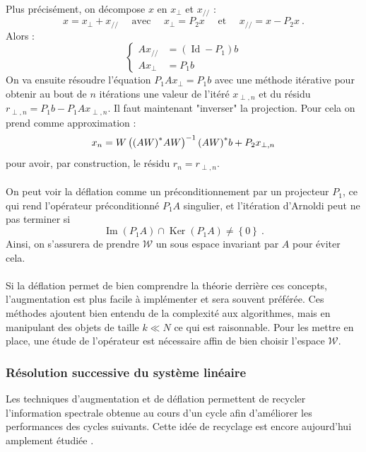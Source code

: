       \paragraph{}
      Plus précisément, on décompose $x$ en $x_\perp$ et $x_{//}$ :
      \[x = x_\perp + x_{//}\quad\text{ avec }\quad x_\perp = P_2x\quad\text{ et }\quad x_{//} = x - P_2x\ .\]
      Alors :
      \begin{equation*}
        \left\{
        \begin{aligned}
          Ax_{//} &= \left(\operatorname{Id} - P_1\right)b \\
          Ax_\perp &= P_1b
        \end{aligned}
        \right.
      \end{equation*}
      On va ensuite résoudre l'équation $P_1Ax_\perp = P_1b$ avec une méthode itérative pour obtenir au bout de $n$ itérations une valeur de l'itéré $x_{\perp, n}$ et du résidu $r_{\perp, n} = P_1b - P_1Ax_{\perp, n}$.
      Il faut maintenant "inverser" la projection.
      Pour cela on prend comme approximation :
      $$x_n = W\left({\left(AW\right)}^*AW\right)^{-1}{\left(AW\right)}^*b + P_2x_{\perp, n}$$
      pour avoir, par construction, le résidu $r_n = r_{\perp, n}$.

      \paragraph{}
      On peut voir la déflation comme un préconditionnement par un projecteur $P_1$, ce qui rend l'opérateur préconditionné $P_1A$ singulier, et l'itération d'Arnoldi peut ne pas terminer si
      \[\operatorname{Im}\left(P_1A\right) \cap \operatorname{Ker}\left(P_1A\right) \neq \left\{0\right\}\ .\]
      Ainsi, on s'assurera de prendre $\mathcal{W}$ un sous espace invariant par $A$ pour éviter cela.


    \paragraph{}
    Si la déflation permet de bien comprendre la théorie derrière ces concepts, l'augmentation est plus facile à implémenter et sera souvent préférée.
    Ces méthodes ajoutent bien entendu de la complexité aux algorithmes, mais en manipulant des objets de taille $k \ll N$ ce qui est raisonnable.
    Pour les mettre en place, une étude de l'opérateur est nécessaire affin de bien choisir l'espace $\mathcal{W}$.


    \subsubsection{Résolution successive du système linéaire}
    Les techniques d'augmentation et de déflation permettent de recycler l'information spectrale obtenue au cours d'un cycle afin d'améliorer les performances des cycles suivants.
    Cette idée de recyclage est encore aujourd'hui amplement étudiée \cite{JolivetTournier2016}.
